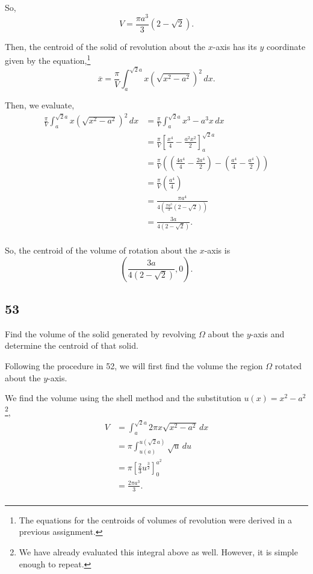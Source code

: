\documentclass[../hw8]{subfiles}
\begin{document}
So, \[V=\frac{\pi a^3}{3}(2-\sqrt{2}).\]

Then, the centroid of the solid of revolution about the $x$-axis has its $y$ coordinate given by the equation,\footnote{The equations for the centroids of volumes of revolution were derived in a previous assignment.} \[\overline{x}=\frac{\pi}{V}\int_{a}^{\sqrt{2}a}x{\left( \sqrt{x^2-a^2} \right)}^2\,dx.\]

Then, we evaluate,
\begin{align*}
    \frac{\pi}{V}\int_{a}^{\sqrt{2}a}x{\left( \sqrt{x^2-a^2} \right)}^2\,dx &= \frac{\pi}{V} \int_{a}^{\sqrt{2}a} x^3-a^3x\,dx \\
    &= \frac{\pi}{V} {\left[ \frac{x^4}{4} - \frac{a^2x^2}{2} \right]}_{a}^{\sqrt{2}a} \\
    &= \frac{\pi}{V} \left( \left( \frac{4a^4}{4} -\frac{2a^4}{2}\right) - \left( \frac{a^4}{4}-\frac{a^4} {2} \right)\right) \\
    &= \frac{\pi}{V} \left( \frac{a^4}{4} \right) \\
    &= \frac{\pi a^4}{4\left( \frac{\pi a^3}{3}(2-\sqrt{2}) \right)} \\
    &= \frac{3a}{4(2-\sqrt{2})}. \\
\end{align*}

So, the centroid of the volume of rotation about the $x$-axis is \[\left( \frac{3a}{4(2-\sqrt{2})},0 \right).\]

\subsection*{53}
Find the volume of the solid generated by revolving $\Omega$ about the $y$-axis and determine the centroid of that solid.

Following the procedure in 52, we will first find the volume the region $\Omega$ rotated about the $y$-axis.

We find the volume using the shell method and the substitution $u(x)=x^2-a^2$\footnote{We have already evaluated this integral above as well. However, it is simple enough to repeat.},
\begin{align*}
    V &= \int_{a}^{\sqrt{2}a} 2\pi x\sqrt{x^2-a^2}\,dx \\
    &= \pi \int_{u(a)}^{u(\sqrt{2}a)} \sqrt{u}\,du \\
    &= \pi {\left[ \frac{2}{3}u^{\frac{3}{2}} \right]}_{0}^{a^2} \\
    &= \frac{2\pi a^3}{3}. \\
\end{align*}
\end{document}
